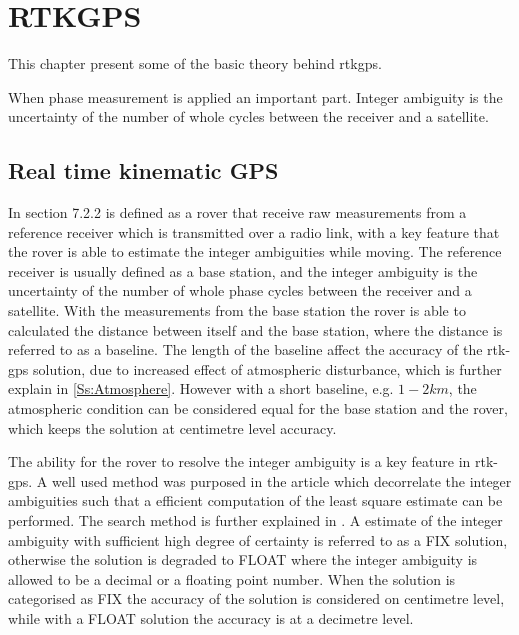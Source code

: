 \chapter{RTKGPS}
This chapter present some of the basic theory behind rtkgps.

When phase measurement is applied an important part. Integer ambiguity is the uncertainty of the number of whole cycles between the receiver and a satellite.


\section{Real time kinematic GPS}\label{ss:rtk-gps}
In \citep{misra2011global} section 7.2.2  is defined as a rover that receive raw measurements from a reference receiver which is transmitted over a radio link, with a key feature that the rover is able to estimate the integer ambiguities while moving. The reference receiver is usually defined as a base station, and the integer ambiguity is the uncertainty of the number of whole phase cycles between the receiver and a satellite. With the measurements from the base station the rover is able to calculated the distance between itself and the base station, where the distance is referred to as a baseline. The length of the baseline affect the accuracy of the \gls{rtk-gps} solution, due to increased effect of atmospheric disturbance, which is further explain in \ref{Ss:Atmosphere}. However with a short baseline, e.g. $1-2 km$, the atmospheric condition can be considered equal for the base station and the rover, which keeps the solution  at centimetre level accuracy.

The ability for the rover to resolve the integer ambiguity is a key feature in \gls{rtk-gps}. A well used method was purposed in the article \citep{teunissen1994new} which decorrelate the integer ambiguities such that a efficient computation of the least square estimate can be performed. The search method is further explained in \citep{teunissen1995least}. A estimate of the integer ambiguity with sufficient high degree of certainty is referred to as a FIX solution, otherwise the solution is degraded to FLOAT where the integer ambiguity is allowed to be a decimal or a floating point number. When the solution is categorised as FIX the accuracy of the solution is considered on centimetre level, while with a FLOAT solution the accuracy is at a decimetre level.


